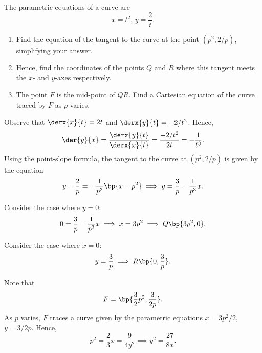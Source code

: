 \begin{problem}
    The parametric equations of a curve are \[x = t^2, \, y = \frac2t.\]
    \begin{enumerate}
        \item Find the equation of the tangent to the curve at the point $(p^2, 2/p)$, simplifying your answer.
        \item Hence, find the coordinates of the points $Q$ and $R$ where this tangent meets the $x$- and $y$-axes respectively.
        \item The point $F$ is the mid-point of $QR$. Find a Cartesian equation of the curve traced by $F$ as $p$ varies.
    \end{enumerate}
\end{problem}
\begin{solution}
    \begin{ppart}
        Observe that $\derx{x}{t} = 2t$ and $\derx{y}{t} = -2/t^2$. Hence, \[\der{y}{x} = \frac{\derx{y}{t}}{\derx{x}{t}} = \frac{-2/t^2}{2t} = -\frac1{t^3}.\] Using the point-slope formula, the tangent to the curve at $(p^2, 2/p)$ is given by the equation \[y - \frac2p = -\frac1{p^3} \bp{x - p^2} \implies y = \frac3p - \frac1{p^3} x.\]
    \end{ppart}
    \begin{ppart}
        Consider the case where $y = 0$: \[0 = \frac3p - \frac1{p^3} x \implies x = 3p^2 \implies Q\bp{3p^2, 0}.\]

        Consider the case where $x = 0$: \[y = \frac3p \implies R\bp{0, \frac3p}.\]
    \end{ppart}
    \begin{ppart}
        Note that \[F = \bp{\frac32 p^2, \frac3{2p}}.\] As $p$ varies, $F$ traces a curve given by the parametric equations $x = 3p^2/2$, $y = 3/2p$. Hence, \[p^2 = \frac23 x = \frac{9}{4y^2} \implies y^2 = \frac{27}{8x}.\]
    \end{ppart}
\end{solution}

